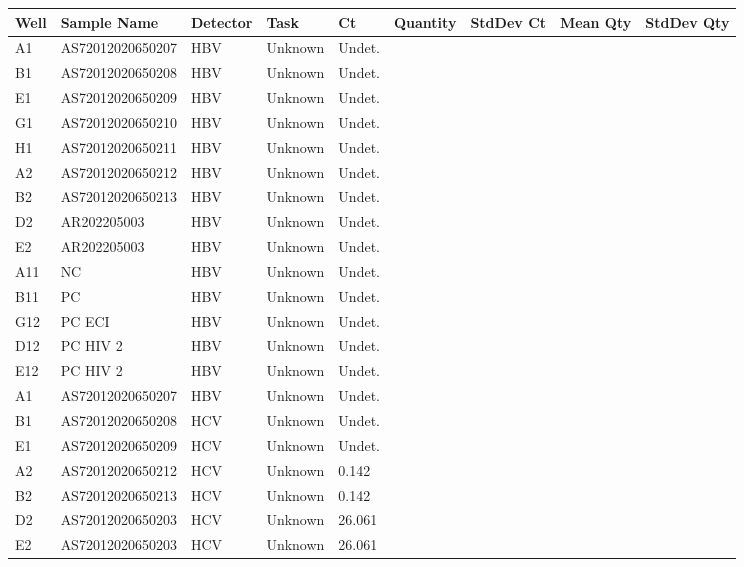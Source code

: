 \documentclass[UTF8,10pt,a4paper,fontset=fandol]{ctexart}
\newcommand{\fieldvalue}[1]{#1}
\begin{document}
\begin{center}
\scriptsize
\begin{tabular}{|p{0.7cm}|p{3.3cm}|p{1.0cm}|p{1.2cm}|p{0.8cm}|p{1.0cm}|p{1.0cm}|p{1.0cm}|p{1.0cm}|}
\hline
\textbf{Well} & \textbf{Sample Name} & \textbf{Detector} &
\textbf{Task} & \textbf{Ct} & \textbf{Quantity} &
\textbf{StdDev Ct} & \textbf{Mean Qty} & \textbf{StdDev Qty}\\
\hline
A1 & AS72012020650207 & HBV & Unknown & Undet. & & & &\\
\hline
B1 & AS72012020650208 & HBV & Unknown & Undet. & & & &\\
\hline
E1 & AS72012020650209 & HBV & Unknown & Undet. & & & &\\
\hline
G1 & AS72012020650210 & HBV & Unknown & Undet. & & & &\\
\hline
H1 & AS72012020650211 & HBV & Unknown & Undet. & & & &\\
\hline
A2 & AS72012020650212 & HBV & Unknown & Undet. & & & &\\
\hline
B2 & AS72012020650213 & HBV & Unknown & Undet. & & & &\\
\hline
D2 & AR202205003 & HBV & Unknown & Undet. & & & &\\
\hline
E2 & AR202205003 & HBV & Unknown & Undet. & & & &\\
\hline
A11 & NC & HBV & Unknown & Undet. & & & &\\
\hline
B11 & PC & HBV & Unknown & Undet. & & & &\\
\hline
G12 & PC ECI & HBV & Unknown & Undet. & & & &\\
\hline
D12 & PC HIV 2 & HBV & Unknown & Undet. & & & &\\
\hline
E12 & PC HIV 2 & HBV & Unknown & Undet. & & & &\\
\hline
A1 & AS72012020650207 & HBV & Unknown & Undet. & & & &\\
\hline
B1 & AS72012020650208 & HCV & Unknown & Undet. & & & &\\
\hline
E1 & AS72012020650209 & HCV & Unknown & Undet. & & & &\\
\hline
A2 & AS72012020650212 & HCV & Unknown &
\fieldvalue{0.142} & & & &\\
\hline
B2 & AS72012020650213 & HCV & Unknown &
\fieldvalue{0.142} & & & &\\
\hline
D2 & AS72012020650203 & HCV & Unknown &
\fieldvalue{26.061} & & & &\\
\hline
E2 & AS72012020650203 & HCV & Unknown &
\fieldvalue{26.061} & & & &\\
\hline
\end{tabular}
\end{center}
\end{document}
